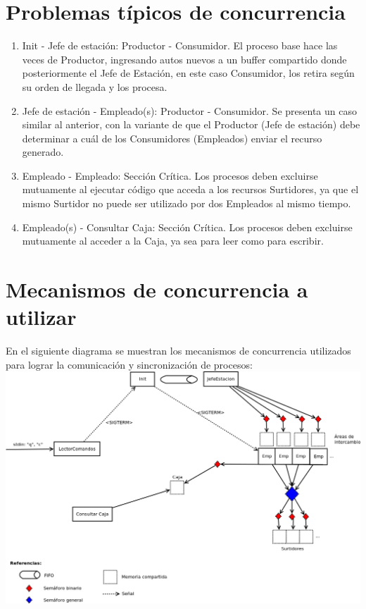 \documentclass{article}
\begin{document}
\section{Problemas típicos de concurrencia}
\begin{enumerate}
	\item Init - Jefe de estación: Productor - Consumidor. El proceso base hace las veces de Productor, ingresando autos nuevos a un buffer compartido donde posteriormente el Jefe de Estación, en este caso Consumidor, los retira según su orden de llegada y los procesa.
	\item Jefe de estación - Empleado(s): Productor - Consumidor. Se presenta un caso similar al anterior, con la variante de que el Productor (Jefe de estación) debe determinar a cuál de los Consumidores (Empleados) enviar el recurso generado.
	\item Empleado - Empleado: Sección Crítica. Los procesos deben excluirse mutuamente al ejecutar código que acceda a los recursos Surtidores, ya que el mismo Surtidor no puede ser utilizado por dos Empleados al mismo tiempo.
	\item Empleado(s) - Consultar Caja: Sección Crítica. Los procesos deben excluirse mutuamente al acceder a la Caja, ya sea para leer como para escribir.
\end{enumerate}
\section{Mecanismos de concurrencia a utilizar}
En el siguiente diagrama se muestran los mecanismos de concurrencia utilizados para lograr la comunicación y sincronización de procesos:
\\[1\baselineskip]
\includegraphics[width=\textwidth]{mecanismos}
\end{document}
